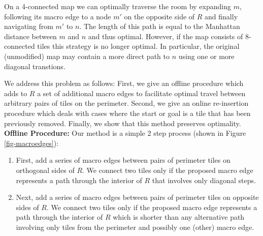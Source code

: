 On a 4-connected map we can optimally traverse the room by expanding $m$, following
its macro edge to a node $m'$ on the opposite side of $R$ and finally navigating from $m'$ to $n$.
The length of this path is equal to the Manhattan distance between $m$ and $n$ and thus optimal.
However, if the map consists of 8-connected tiles this strategy is no longer optimal.
In particular, the original (unmodified) map may contain a more direct path to $n$ using one or more diagonal
transtions.
\par
We address this problem as follows:
First, we give an offline procedure which adds to $R$ a set of additional macro edges
to facilitate optimal travel between arbitrary pairs of tiles on the perimeter.
Second, we give an online re-insertion procedure which deals with cases where the start or
goal is a tile that has been previously removed.
Finally, we show that this method preserves optimality.
\\ \newline
\textbf{Offline Procedure: }
Our method is a simple 2 step process (shown in Figure \ref{fig-macroedges}):

\begin{enumerate}
\item{First, add a series of macro edges between pairs of perimeter tiles on orthogonal sides of $R$. 
We connect two tiles only if the proposed macro edge represents a path through the interior of $R$ that involves
only diagonal steps. }
\item{Next, add a series of macro edges between pairs of perimeter tiles on opposite sides of $R$.
We connect two tiles only if the proposed macro edge represents a path through the interior of $R$ which is shorter
than any alternative path involving only tiles from the perimeter and possibly one (other) macro edge.
}
\end{enumerate}

